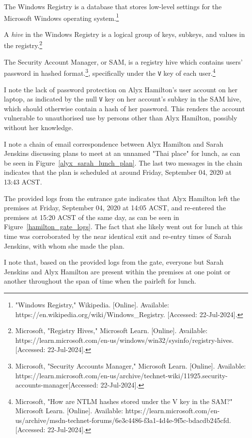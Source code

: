 \begin{myenum}
    \item The Windows Registry is a database that stores low-level settings for the Microsoft Windows operating system.\footnote{"Windows Registry," Wikipedia. [Online]. Available: https://en.wikipedia.org/wiki/Windows\_Registry. [Accessed: 22-Jul-2024].}
    \item A \emph{hive} in the Windows Registry is a logical group of keys, subkeys, and values in the registry.\footnote{Microsoft, "Registry Hives," Microsoft Learn. [Online]. Available: https://learn.microsoft.com/en-us/windows/win32/sysinfo/registry-hives. [Accessed: 22-Jul-2024].}
    \item The Security Account Manager, or SAM, is a registry hive which contains users' password in hashed format.\footnote{Microsoft, "Security Accounts Manager," Microsoft Learn. [Online]. Available: https://learn.microsoft.com/en-us/archive/technet-wiki/11925.security-accounts-manager[Accessed: 22-Jul-2024].}, specifically under the \texttt{V} key of each user.\footnote{Microsoft, "How are NTLM hashes stored under the V key in the SAM?" Microsoft Learn. [Online]. Available: https://learn.microsoft.com/en-us/archive/msdn-technet-forums/6e3c4486-f3a1-4d4e-9f5c-bdacdb245cfd. [Accessed: 22-Jul-2024].}
    \item \label{no_password} I note the lack of password protection on Alyx Hamilton's user account on her laptop, as indicated by the null \texttt{V} key on her account's subkey in the SAM hive, which should otherwise contain a hash of her password. This renders the account vulnerable to unauthorised use by persons other than Alyx Hamilton, possibly without her knowledge.
    \item I note a chain of email correspondence between Alyx Hamilton and Sarah Jenskins discussing plans to meet at an unnamed "Thai place" for lunch, as can be seen in Figure~\ref{alyx_sarah_lunch_plan}. The last two messages in the chain indicates that the plan is scheduled at around Friday, September 04, 2020 at 13:43 ACST.
    \item The provided logs from the entrance gate indicates that Alyx Hamilton left the premises at Friday, September 04, 2020 at 14:05 ACST, and re-entered the premises at 15:20 ACST of the same day, as can be seen in Figure~\ref{hamilton_gate_logs}. The fact that she likely went out for lunch at this time was corroborated by the near identical exit and re-entry times of Sarah Jenskins, with whom she made the plan.
    \item I note that, based on the provided logs from the gate, everyone but Sarah Jenskins and Alyx Hamilton are present within the premises at one point or another throughout the span of time when the pairleft for lunch.

\end{myenum}
